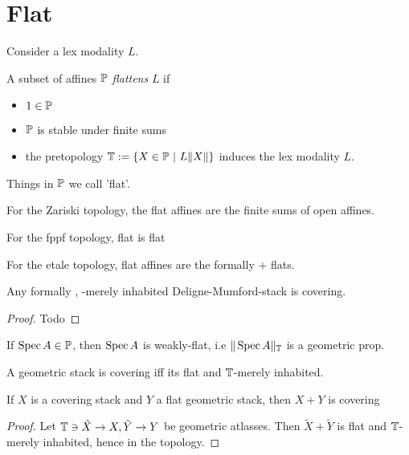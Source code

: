 \section{Flat}
Consider a lex modality $L$.
\begin{definition}
	A subset of affines $\mathbb{P}$ \emph{flattens} $L$ if
	\begin{itemize}
		\item $1 \in \mathbb{P}$
		\item $\mathbb{P}$ is stable under finite sums
		\item 	 the pretopology $\bT := \{ X \in \bP \ | \ L \| X \| \}$ induces the lex modality $L$.
	\end{itemize}
	
\end{definition}

Things in $\mathbb{P}$ we call 'flat'.
\begin{example}
	For the Zariski topology, the flat affines are the finite sums of open affines.
\end{example}
\begin{example}
	For the fppf topology, flat is flat
\end{example}
\begin{example}
	For the etale topology, flat affines are the formally \etale + flats.
\end{example}
\begin{lemma}{\label{lemma:coveringDMstacks}}
	Any formally \etale, \etale-merely inhabited Deligne-Mumford-stack is covering.
\end{lemma}
\begin{proof}
	Todo
\end{proof}
\begin{lemma}
	If $\operatorname{Spec} A \in \mathbb{P}$, then $\operatorname{Spec} A$ is weakly-flat, i.e $\| \operatorname{Spec} A\|_{\mathbb{T}}$ is a geometric prop.
\end{lemma}
\begin{lemma}{\label{lemma:detectCovering}}
	A geometric stack is covering iff its flat and $\mathbb{T}$-merely inhabited.
\end{lemma}

\begin{lemma}
	If $X$ is a covering stack and $Y$ a flat geometric stack, then $X + Y$ is covering
\end{lemma}
\begin{proof}
	Let $\mathbb{T} \ni \tilde X \to X, \tilde Y \to Y$ be geometric atlasses. Then $\tilde X+ \tilde Y$ is flat and $\mathbb{T}$-merely inhabited, hence in the topology.
\end{proof}



